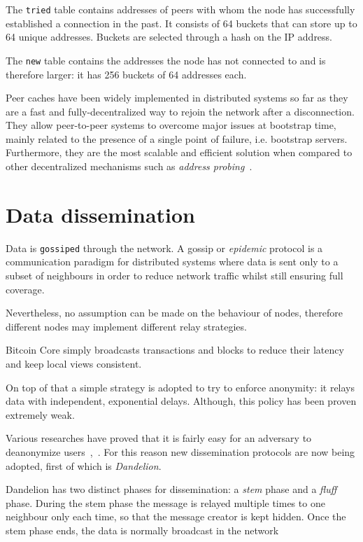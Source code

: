 The \texttt{tried} table contains addresses of peers with whom the node has successfully established a connection in the past. It consists of 64 buckets that can store up to 64 unique addresses. Buckets are selected through a hash on the IP address.

The \texttt{new} table contains the addresses the node has not connected to and is therefore larger: it has 256 buckets of 64 addresses each.

Peer caches have been widely implemented in distributed systems so far as they are a fast and fully-decentralized way to rejoin the network after a disconnection. They allow peer-to-peer systems to overcome major issues at bootstrap time, mainly related to the presence of a single point of failure, i.e. bootstrap servers. Furthermore, they are the most scalable and efficient solution when compared to other decentralized mechanisms such as \textit{address probing}~\cite{decentrbootstrapp2p}.

\section{Data dissemination}\label{sec:dissem}
Data is \texttt{gossiped} through the network. A gossip or \textit{epidemic} protocol is a communication paradigm for distributed systems where data is sent only to a subset of neighbours in order to reduce network traffic whilst still ensuring full coverage.

Nevertheless, no assumption can be made on the behaviour of nodes, therefore different nodes may implement different relay strategies.

Bitcoin Core simply broadcasts transactions and blocks to reduce their latency and keep local views consistent.

On top of that a simple strategy is adopted to try to enforce anonymity: it relays data with independent, exponential delays. Although, this policy has been proven extremely weak.

Various researches have proved that it is fairly easy for an adversary to deanonymize users~\cite{biryukov2014deanonymisation},~\cite{koshy2014deanon}. For this reason new dissemination protocols are now being adopted, first of which is \textit{Dandelion}. 

Dandelion has two distinct phases for dissemination: a \textit{stem} phase and a \textit{fluff} phase. During the stem phase the message is relayed multiple times to one neighbour only each time, so that the message creator is kept hidden. Once the stem phase ends, the data is normally broadcast in the network~\cite{dand}

